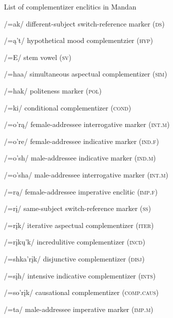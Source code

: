 \largerpage
\begin{exe}

\item\label{listofcomplementizers} List of complementizer enclitics in Mandan

\begin{xlist}
    

	\item /=ak/	different-subject switch-reference marker (\textsc{ds})
 
	\item /=ą't/ hypothetical mood complementzier (\textsc{hyp})
 
	\item /=E/ stem vowel (\textsc{sv})
 
	\item /=haa/ simultaneous aspectual complementizer (\textsc{sim})

        \item /=hak/ politeness marker (\textsc{pol})

        \item /=ki/ conditional complementizer (\textsc{cond})

        \item /=o'rą/ female-addressee interrogative marker (\textsc{int.m})

        \item /=o're/ female-addressee indicative marker (\textsc{ind.f})

        \item /=o'sh/ male-addressee indicative marker (\textsc{ind.m})

        \item /=o'sha/ male-addressee interrogative marker (\textsc{int.m})

        \item /=rą/ female-addressee imperative enclitic (\textsc{imp.f})

        \item /=rį/ same-subject switch-reference marker (\textsc{ss})

        \item /=rįk/ iterative aspectual complementizer (\textsc{iter})

        \item /=rįkų'k/ incredulitive complementizer (\textsc{incd})

        \item /=shka'rįk/ disjunctive complementizer (\textsc{disj})

        \item /=sįh/ intensive indicative complementizer (\textsc{ints})

        \item /=so'rįk/ causational complementizer (\textsc{comp.caus})

        \item /=ta/ male-addressee imperative marker (\textsc{imp.m})

\end{xlist}

\end{exe}

